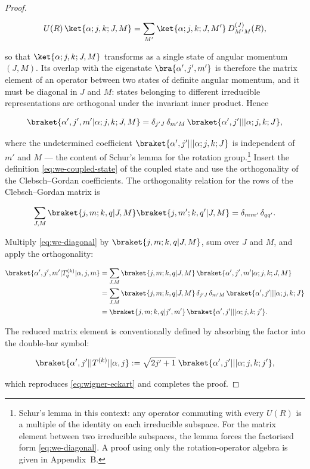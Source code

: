 \begin{proof}
\begin{linenomath}
\begin{equation*}
U(R)\,\ket{\alpha; j,k; J,M}
= \sum_{M'} \ket{\alpha; j,k; J,M'}\,D^{(J)}_{M'M}(R) ,
\end{equation*}
\end{linenomath}
so that $\ket{\alpha; j,k; J,M}$ transforms as a single state of angular momentum $(J,M)$. Its overlap with the eigenstate $\bra{\alpha',j',m'}$ is therefore the matrix element of an operator between two states of definite angular momentum, and it must be diagonal in $J$ and $M$: states belonging to different irreducible representations are orthogonal under the invariant inner product. Hence
\begin{linenomath}
\begin{equation}
\braket{\alpha',j',m'|\alpha; j,k; J,M}
= \delta_{j'J}\,\delta_{m'M}\,
  \braket{\alpha',j'|||\alpha;j,k;J} ,
\label{eq:we-diagonal}
\end{equation}
\end{linenomath}
where the undetermined coefficient $\braket{\alpha',j'|||\alpha;j,k;J}$ is independent of $m'$ and $M$ --- the content of Schur's lemma for the rotation group.\footnote{Schur's lemma in this context: any operator commuting with every $U(R)$ is a multiple of the identity on each irreducible subspace. For the matrix element between two irreducible subspaces, the lemma forces the factorised form \eqref{eq:we-diagonal}. A proof using only the rotation-operator algebra is given in Appendix~B.} Insert the definition \eqref{eq:we-coupled-state} of the coupled state and use the orthogonality of the Clebsch--Gordan coefficients. The orthogonality relation for the rows of the Clebsch--Gordan matrix is
\begin{linenomath}
\begin{equation*}
\sum_{J,M} \braket{j,m;k,q|J,M}\braket{j,m';k,q'|J,M}
= \delta_{mm'}\,\delta_{qq'} .
\end{equation*}
\end{linenomath}
Multiply \eqref{eq:we-diagonal} by $\braket{j,m;k,q|J,M}$, sum over $J$ and $M$, and apply the orthogonality:
\begin{linenomath}
\begin{align*}
\braket{\alpha',j',m'|T^{(k)}_q|\alpha,j,m}
&= \sum_{J,M} \braket{j,m;k,q|J,M}\,
   \braket{\alpha',j',m'|\alpha;j,k;J,M} \\
&= \sum_{J,M} \braket{j,m;k,q|J,M}\,
   \delta_{j'J}\,\delta_{m'M}\,
   \braket{\alpha',j'|||\alpha;j,k;J} \\
&= \braket{j,m;k,q|j',m'}\,
   \braket{\alpha',j'|||\alpha;j,k;j'} .
\end{align*}
\end{linenomath}
The reduced matrix element is conventionally defined by absorbing the factor into the double-bar symbol:
\begin{linenomath}
\begin{equation*}
\braket{\alpha',j'||T^{(k)}||\alpha,j}
:= \sqrt{2j'+1}\; \braket{\alpha',j'|||\alpha;j,k;j'} ,
\end{equation*}
\end{linenomath}
which reproduces \eqref{eq:wigner-eckart} and completes the proof.
\end{proof}

